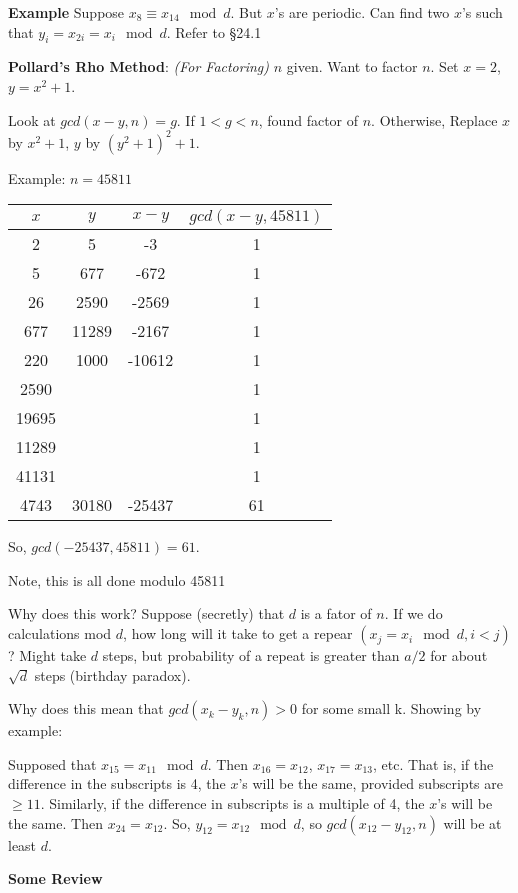 \textbf{Example} Suppose $x_8 \equiv x_{14} \mod d$. But $x$'s are periodic. Can find two $x$'s such that $y_i = x_{2i} = x_i \mod d$. Refer to \S 24.1

\textbf{Pollard's Rho Method}: \textit{(For Factoring)} $n$ given. Want to factor $n$. Set $x=2$, $y = x^2+1$.

Look at $gcd(x-y,n) = g$. If $1 < g < n$, found factor of $n$. Otherwise, Replace $x$ by $x^2+1$, $y$ by $(y^2+1)^2+1$.

Example: $n=45811$ \\
\begin{tabular}{|c|c|c|c|}\hline
	$x$ & $y$ & $x-y$ & $gcd(x-y,45811)$ \\ \hline
	2 & 5 & -3 & 1 \\ \hline
	5 & 677 & -672 & 1 \\ \hline
	26 & 2590 & -2569 & 1 \\ \hline
	677 & 11289 & -2167 & 1 \\ \hline
	220 & 1000 & -10612 & 1 \\ \hline
	2590 & & & 1 \\ \hline
	19695 & & & 1 \\ \hline
	11289 & & & 1 \\ \hline
	41131 & & & 1 \\ \hline
	4743 & 30180 & -25437 & 61 \\ \hline
\end{tabular}

So, $gcd(-25437,45811) = 61$. 

Note, this is all done modulo 45811

Why does this work? Suppose (secretly) that $d$ is a fator of $n$. If we do calculations mod $d$, how long will it take to get a repear $(x_j = x_i \mod d, i<j)$? Might take $d$ steps, but probability of a repeat is greater than $a/2$ for about $\sqrt{d}$ steps (birthday paradox).

Why does this mean that $gcd(x_k-y_k,n) > 0$ for some small k. Showing by example:

Supposed that $x_{15} = x_{11} \mod d$. Then  $x_{16} = x_{12}$,  $x_{17} = x_{13}$, etc. That is, if the difference in the subscripts is 4, the $x$'s will be the same, provided subscripts are $\geq 11$. Similarly, if the difference in subscripts is a multiple of 4, the $x$'s will be the same. Then $x_{24} = x_{12}$. So, $y_{12} = x_{12} \mod d$, so $gcd(x_{12}-y_{12},n)$ will be at least $d$.

\textbf{Some Review}

